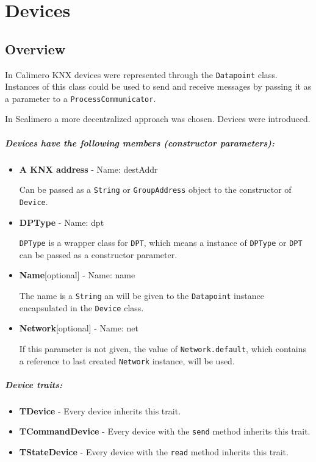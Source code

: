 \chapter{Devices}
\section{Overview}

In Calimero KNX devices were represented through the \lstinline!Datapoint! class. Instances of this class could be used to send and receive messages by passing it as a parameter to a \lstinline!ProcessCommunicator!.

In Scalimero a more decentralized approach was chosen. Devices were introduced.

\paragraph{Devices have the following members (constructor parameters):}
\begin{itemize}
  \item \textbf{A KNX address} - Name: destAddr

    Can be passed as a \lstinline!String! or \lstinline!GroupAddress! object to the constructor of \lstinline!Device!.
  \item \textbf{DPType} - Name: dpt

    \lstinline!DPType! is a wrapper class for \lstinline!DPT!, which means a instance of \lstinline!DPType! or \lstinline!DPT! can be passed as a constructor parameter.
  \item \textbf{Name}[optional] - Name: name

    The name is a \lstinline!String! an will be given to the \lstinline!Datapoint! instance encapsulated in the \lstinline!Device! class.
  \item \textbf{Network}[optional] - Name: net

    If this parameter is not given, the value of \lstinline!Network.default!, which contains a reference to last created \lstinline!Network! instance, will be used.
\end{itemize}

\paragraph{Device traits:}
\begin{itemize}
  \item \textbf{TDevice} - Every device inherits this trait.
  \item \textbf{TCommandDevice} - Every device with the \lstinline!send! method inherits this trait.
  \item \textbf{TStateDevice} - Every device with the \lstinline!read! method inherits this trait.
\end{itemize}

